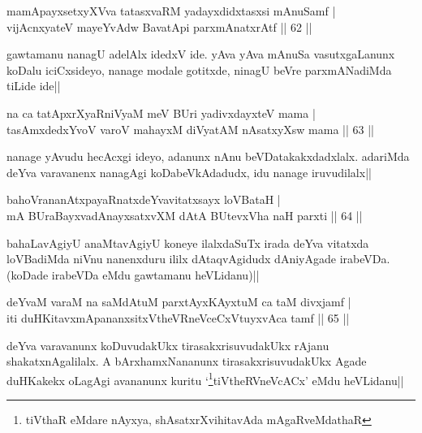 \begin{shl}
mamApayxsetxyXVva tatasxvaRM yadayxdidxtasxsi mAnuSamf | \\
vijAcnxyateV mayeYvA\s \s dw BavatA\s pi parxmAnatxrAtf \hfill|| 62 || 
\end{shl}

\begin{artha}
gawtamanu nanagU adelAlx idedxV ide. yAva yAva mAnuSa vasutxgaLanunx 
koDalu iciCxsideyo, nanage modale gotitxde, ninagU beVre parxmANadiMda 
tiLide ide||
\end{artha}

\begin{shl}
na ca tatApxrXyaRniVyaM meV BUri yadivxdayxteV mama | \\
tasAmxdedxYvoV varoV mahayxM diVyatAM nAsatxyXsw mama \hfill|| 63 || 
\end{shl}

\begin{artha}
nanage yAvudu hecAcxgi ideyo, adanunx nAnu beVDatakakxdadxlalx. 
adariMda deYva varavanenx nanagAgi koDabeVkAdadudx, idu nanage 
iruvudilalx||
\end{artha}


\begin{shl}
bahoVrananAtxpayaRnatxdeYvavitatxsayx loVBataH | \\
mA BUraBayxvadAnayxsatxvXM dAtA BUtevxVha naH parxti \hfill|| 64 || 
\end{shl}

\begin{artha}
bahaLavAgiyU anaMtavAgiyU koneye ilalxdaSuTx irada deYva vitatxda 
loVBadiMda niVnu nanenxduru ililx dAtaqvAgidudx dAniyAgade irabeVDa. 
(koDade irabeVDa eMdu gawtamanu heVLidanu)||
\end{artha}


\begin{shl}
deYvaM varaM na saMdAtuM parxtAyxKAyxtuM ca taM divxjamf | \\
iti duHKitavxmApananxsitxVtheVRneVceCxVtuyxvAca tamf \hfill|| 65 || 
\end{shl}

\begin{artha}
deYva varavanunx koDuvudakUkx tirasakxrisuvudakUkx rAjanu 
shakatxnAgalilalx. A bArxhamxNananunx tirasakxrisuvudakUkx Agade 
duHKakekx oLagAgi avananunx kuritu `\footnote[1]{tiVthaR eMdare 
nAyxya, shAsatxrXvihitavAda mAgaRveMdathaR}tiVtheRVneVcACx' eMdu heVLidanu||
\end{artha}

